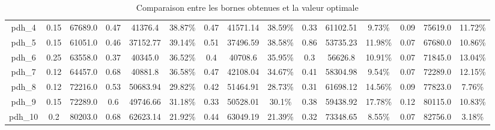 \documentclass[main.tex]{subfiles}
\begin{document}
\begin{landscape}
\begin{table}[h]
{\begin{tabular}{c|cc|ccc|ccc|ccc|ccc}
	pdh\_4 &0.15 &67689.0 &0.47 &41376.4 &38.87\% &0.47 &41571.14 &38.59\% &0.33 &61102.51 &9.73\% &0.09 &75619.0 &11.72\%\\
	pdh\_5 &0.15 &61051.0 &0.46 &37152.77 &39.14\% &0.51 &37496.59 &38.58\% &0.86 &53735.23 &11.98\% &0.07 &67680.0 &10.86\%\\
	pdh\_6 &0.25 &63558.0 &0.37 &40345.0 &36.52\% &0.4 &40708.6 &35.95\% &0.3 &56626.8 &10.91\% &0.07 &71845.0 &13.04\%\\
	pdh\_7 &0.12 &64457.0 &0.68 &40881.8 &36.58\% &0.47 &42108.04 &34.67\% &0.41 &58304.98 &9.54\% &0.07 &72289.0 &12.15\%\\
	pdh\_8 &0.12 &72216.0 &0.53 &50683.94 &29.82\% &0.42 &51464.91 &28.73\% &0.31 &61698.12 &14.56\% &0.09 &77823.0 &7.76\%\\
	pdh\_9 &0.15 &72289.0 &0.6 &49746.66 &31.18\% &0.33 &50528.01 &30.1\% &0.38 &59438.92 &17.78\% &0.12 &80115.0 &10.83\%\\
	pdh\_10 &0.2 &80203.0 &0.68 &62623.14 &21.92\% &0.44 &63049.19 &21.39\% &0.32 &73348.65 &8.55\% &0.07 &82756.0 &3.18\%\\
    \end{tabular}
}
\caption{Comparaison entre les bornes obtenues et la valeur optimale}
\end{table}
\end{landscape}
\newpage
\thispagestyle{empty}
\end{document}
